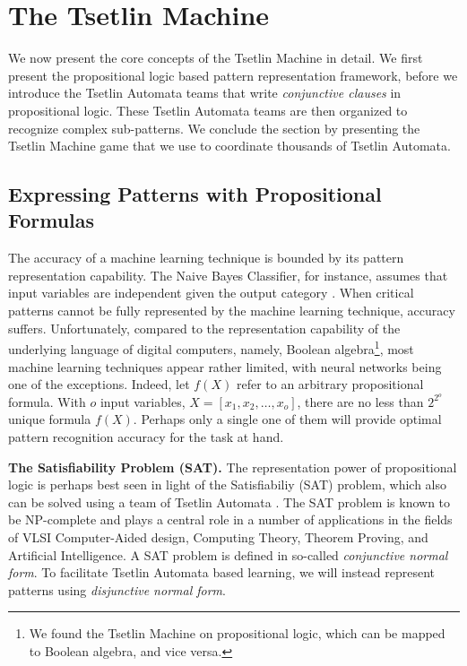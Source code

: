\documentclass[11pt,a4paper]{article}
\begin{document}
\section{The Tsetlin Machine}
\label{sec:tsetlin_machine}

We now present the core concepts of the Tsetlin Machine in detail. We first present the propositional logic based pattern representation framework, before we introduce the Tsetlin Automata teams that write \emph{conjunctive clauses} in propositional logic. These Tsetlin Automata teams are then organized to recognize complex sub-patterns. We conclude the section by presenting the Tsetlin Machine game that we use to coordinate thousands of Tsetlin Automata.

\subsection{Expressing Patterns with Propositional Formulas} 

The accuracy of a machine learning technique is bounded by its pattern representation capability. The Naive Bayes Classifier, for instance, assumes that input variables are independent given the output category \cite{Mitchell1997a}. When critical patterns cannot be fully represented by the machine learning technique, accuracy suffers. Unfortunately, compared to the representation capability of the underlying language of digital computers, namely, Boolean algebra\footnote{We found the Tsetlin Machine on propositional logic, which can be mapped to Boolean algebra, and vice versa.}, most machine learning techniques appear rather limited, with neural networks being one of the exceptions. Indeed, let $f(X)$ refer to an arbitrary propositional formula. With $o$ input variables, $X = [x_1, x_2, \ldots, x_o]$, there are no less than $2^{2^o}$ unique formula $f(X)$. Perhaps only a single one of them will provide optimal pattern recognition accuracy for the task at hand.

{\bf The Satisfiability Problem (SAT).} The representation power of propositional logic is perhaps best seen in light of the Satisfiabiliy (SAT) problem, which also can be solved using a team of Tsetlin Automata \cite{Bouhmala2010a}. The SAT problem is known to be NP-complete \cite{Cook1971} and  plays a central role in a number of applications in the fields of VLSI Computer-Aided design, Computing Theory, Theorem Proving, and Artificial Intelligence. A SAT problem is defined in so-called \emph{conjunctive normal form}. To facilitate Tsetlin Automata based learning, we will instead represent patterns using \emph{disjunctive normal form}. 
\end{document}
